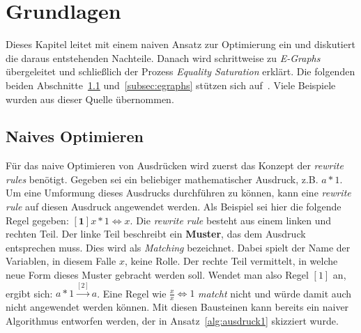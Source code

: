 \section{Grundlagen}\label{sec:grundlagen}


Dieses Kapitel leitet mit einem naiven Ansatz zur Optimierung ein und diskutiert die daraus entstehenden Nachteile.
Danach wird schrittweise zu \textit{E-Graphs}
übergeleitet und schließlich der Prozess \textit{Equality Saturation} erklärt.
Die folgenden beiden Abschnitte~\ref{subsec:naiv} und~\ref{subsec:egraphs} stützen sich auf~\cite{cole}. Viele Beispiele wurden aus dieser Quelle übernommen.

\subsection{Naives Optimieren}\label{subsec:naiv}

Für das naive Optimieren von Ausdrücken wird zuerst das Konzept der \textit{rewrite rules} benötigt. Gegeben sei ein beliebiger mathematischer Ausdruck, z.B.
$a * 1$. Um eine Umformung dieses Ausdrucks durchführen zu können, kann eine \textit{rewrite rule} auf diesen Ausdruck angewendet werden.
Als Beispiel sei hier die folgende Regel gegeben: $[\mathbf{1}] x * 1 \Leftrightarrow x$. Die \textit{rewrite rule} besteht aus einem linken und rechten Teil. Der linke Teil
beschreibt ein \textbf{Muster}, das dem Ausdruck entsprechen muss. Dies wird als \textit{Matching} bezeichnet. Dabei spielt der Name der Variablen, in diesem Falle $x$, keine Rolle.
Der rechte Teil vermittelt, in welche neue Form dieses Muster gebracht werden soll. Wendet man also Regel $[1]$ an,
ergibt sich: $a * 1  \overset{[2]}{\rightarrow} a$. 
Eine Regel wie $\frac{x}{x} \Leftrightarrow 1$ \textit{matcht} nicht und würde damit auch nicht angewendet werden können.
Mit diesen Bausteinen kann bereits ein naiver Algorithmus entworfen werden, der in Ansatz~\ref{alg:ausdruck1} skizziert wurde. 


